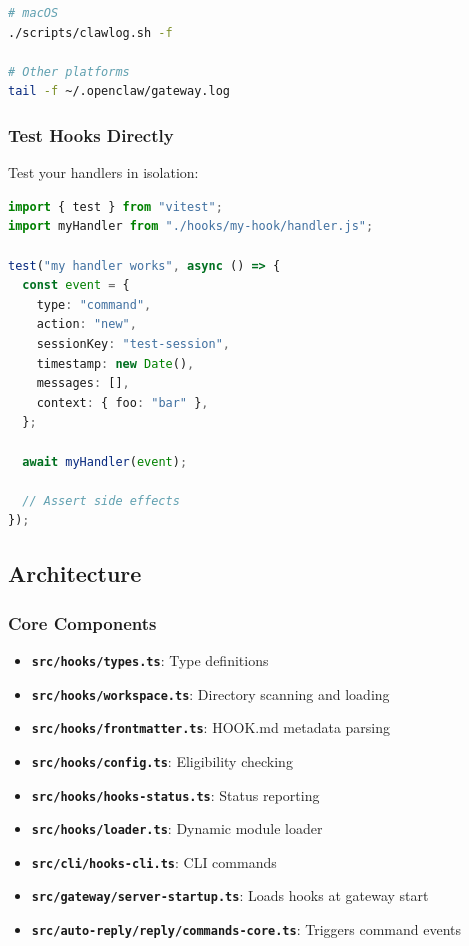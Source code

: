 \begin{lstlisting}[language=bash]
# macOS
./scripts/clawlog.sh -f

# Other platforms
tail -f ~/.openclaw/gateway.log
\end{lstlisting}


\subsubsection{Test Hooks Directly}


Test your handlers in isolation:

\begin{lstlisting}[language=typescript]
import { test } from "vitest";
import myHandler from "./hooks/my-hook/handler.js";

test("my handler works", async () => {
  const event = {
    type: "command",
    action: "new",
    sessionKey: "test-session",
    timestamp: new Date(),
    messages: [],
    context: { foo: "bar" },
  };

  await myHandler(event);

  // Assert side effects
});
\end{lstlisting}


\subsection{Architecture}


\subsubsection{Core Components}


\begin{itemize}
  \item \textbf{\texttt{src/hooks/types.ts}}: Type definitions
  \item \textbf{\texttt{src/hooks/workspace.ts}}: Directory scanning and loading
  \item \textbf{\texttt{src/hooks/frontmatter.ts}}: HOOK.md metadata parsing
  \item \textbf{\texttt{src/hooks/config.ts}}: Eligibility checking
  \item \textbf{\texttt{src/hooks/hooks-status.ts}}: Status reporting
  \item \textbf{\texttt{src/hooks/loader.ts}}: Dynamic module loader
  \item \textbf{\texttt{src/cli/hooks-cli.ts}}: CLI commands
  \item \textbf{\texttt{src/gateway/server-startup.ts}}: Loads hooks at gateway start
  \item \textbf{\texttt{src/auto-reply/reply/commands-core.ts}}: Triggers command events
\end{itemize}


